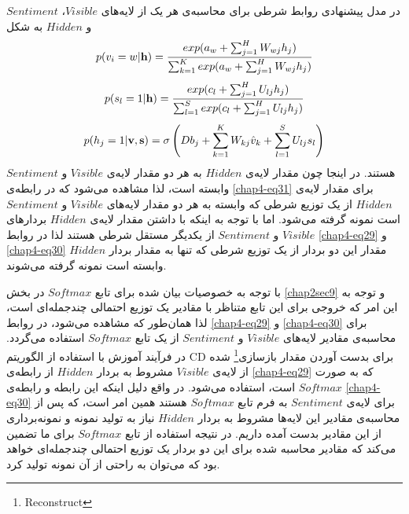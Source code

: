 در مدل پیشنهادی روابط شرطی برای محاسبه‌ی هر یک از لایه‌های
$Visible$، $Sentiment$
و
$Hidden$
 به شکل
\begin{align}
	\centering
	\label{chap4-eq29}
	p(v_{i}=w|\textbf{h})=\dfrac{exp(a_{w}+\sum_{j=1}^{H}W_{wj}h_j)}{\sum_{k=1}^{K}exp(a_{w}+\sum_{j=1}^{H}W_{wj}h_j)}
\end{align}
\begin{align}
	\centering
	\label{chap4-eq30}
	p(s_{l}=1|\textbf{h})=\dfrac{exp(c_{l}+\sum_{j=1}^{H}U_{lj}h_j)}{\sum_{l=1}^{S}exp(c_{l}+\sum_{j=1}^{H}U_{lj}h_j)}
\end{align}
\begin{align}
	\centering
	\label{chap4-eq31}
	p(h_{j}=1|\textbf{v},\textbf{s})=\sigma \left( Db_j + \sum_{k=1}^{K}W_{kj}\hat{v}_k + \sum_{l=1}^{S}U_{lj}s_l \right)
\end{align}
هستند. در اینجا چون مقدار لایه‌ی
$Hidden$
به هر دو مقدار لایه‌ی
$Visible$
و
$Sentiment$
وابسته است، لذا مشاهده می‌‌شود که در رابطه‌ی
\ref{chap4-eq31}
برای مقدار لایه‌ی
$Hidden$
از یک توزیع شرطی که وابسته به هر دو مقدار لایه‌های
$Visible$
و
$Sentiment$
است نمونه گرفته می‌‌شود. اما با توجه به اینکه با داشتن مقدار لایه‌ی
$Hidden$
بردارهای
$Visible$
و
$Sentiment$
از یکدیگر مستقل شرطی هستند لذا در روابط
\ref{chap4-eq29}
و
\ref{chap4-eq30}
مقدار این دو بردار از یک توزیع شرطی که تنها به مقدار بردار
$Hidden$
وابسته است نمونه گرفته می‌‌شوند.

با توجه به خصوصیات بیان شده برای تابع
$Softmax$
در بخش
\ref{chap2sec9}
و توجه به این امر که خروجی برای این تابع متناظر با مقادیر یک توزیع احتمالی‌ چندجمله‌ای است، لذا همان‌طور که مشاهده می‌‌شود، در روابط
\ref{chap4-eq29}
و
\ref{chap4-eq30}
برای محاسبه‌ی مقادیر لایه‌های
$Visible$
و
$Sentiment$
از یک تابع
$Softmax$
استفاده می‌‌گردد. در فرآیند آموزش با استفاده از الگوریتم
CD
برای بدست آوردن مقدار بازسازی\footnote{Reconstruct}
 شده از لایه‌ی
$Visible$
مشروط به بردار
$Hidden$
از رابطه‌ی
\ref{chap4-eq29}
که به صورت
$Softmax$
است، استفاده می‌‌شود. در واقع دلیل اینکه این رابطه و رابطه‌ی
\ref{chap4-eq30}
برای لایه‌ی
$Sentiment$
به فرم تابع
$Softmax$
هستند همین امر است، که پس از محاسبه‌ی مقادیر این لایه‌ها مشروط به بردار
$Hidden$
نیاز به تولید نمونه و نمونه‌برداری از این مقادیر بدست آمده داریم. در نتیجه استفاده از تابع
$Softmax$
برای ما تضمین می‌‌کند که مقادیر محاسبه شده برای این دو بردار یک توزیع احتمالی‌ چندجمله‌ای خواهد بود که می‌‌توان به راحتی‌ از آن نمونه تولید کرد.



%

